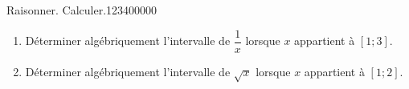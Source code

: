 \begin{pageAD}
\begin{ExoCad}{Raisonner. Calculer.}{1234}{0}{0}{0}{0}{0}
\begin{enumerate}[leftmargin=*]
\item Déterminer algébriquement l'intervalle de $\dfrac{1}{x}$ lorsque $x$ appartient à $[1;3]$. 

\item Déterminer algébriquement l'intervalle de $\sqrt{x}$ lorsque $x$ appartient à $\left[1;2 \right]$. 

\end{enumerate}

\end{ExoCad}
 
\end{pageAD} %


